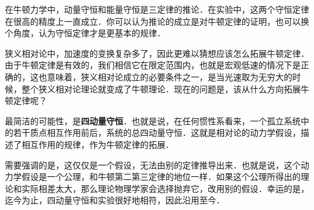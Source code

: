 在牛顿力学中，动量守恒和能量守恒是三定律的推论．在实验中，这两个守恒定律在很高的精度上一直成立．你可以认为推论的成立是对牛顿定律的证明，也可以换个角度，认为守恒定律才是更基本的规律．

狭义相对论中，加速度的变换复杂多了，因此更难以猜想应该怎么拓展牛顿定律．由于牛顿定律是有效的，我们相信它在限定范围内，也就是宏观低速的情况下是正确的，这也意味着，狭义相对论成立的必要条件之一，是当光速取为无穷大的时候，整个狭义相对论理论就变成了牛顿理论．现在的问题是，该从什么方向拓展牛顿定律呢？

最简洁的可能性，是\textbf{四动量守恒}．也就是说，在任何惯性系看来，一个孤立系统中的若干质点相互作用前后，系统的总四动量守恒．这就是相对论的动力学假设，描述了相互作用的规律，作为牛顿定律的拓展．

需要强调的是，这仅仅是一个假设，无法由别的定律推导出来．也就是说，这个动力学假设是一个公理，和牛顿第二第三定律的地位一样．如果这个公理所得出的理论和实际相差太大，那么理论物理学家会选择抛弃它，改用别的假设．幸运的是，迄今为止，四动量守恒和实验很好地相符，因此沿用至今．




